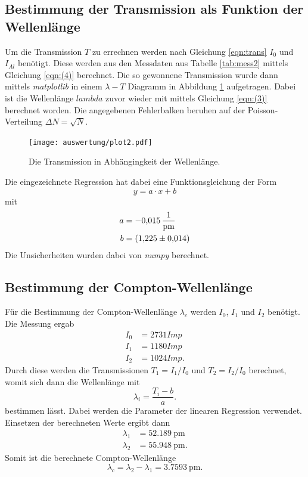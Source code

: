 \subsection{Bestimmung der Transmission als Funktion der Wellenlänge}
\label{sec:transmission}
Um die Transmission $T$ zu errechnen werden nach Gleichung \eqref{eqn:trans} $I_{0}$ und $I_{Al}$ benötigt. Diese werden aus den Messdaten
aus Tabelle \ref{tab:mess2} mittels Gleichung \eqref{eqn:(4)} berechnet. Die so gewonnene Transmission wurde dann mittels 
\textit{matplotlib} \cite{matplotlib} in einem $\lambda-T$ Diagramm in Abbildung \ref{fig:plot2} aufgetragen. Dabei ist die Wellenlänge
$lambda$ zuvor wieder mit mittels Gleichung \eqref{eqn:(3)} berechnet worden. Die angegebenen Fehlerbalken beruhen auf der Poisson-Verteilung
$\Delta N=\sqrt{N}$.
\begin{figure}[H]
    \centering
    \texttt{[image: auswertung/plot2.pdf]}
    \caption{Die Transmission in Abhängingkeit der Wellenlänge.}
    \label{fig:plot2}
\end{figure}
\noindent
Die eingezeichnete Regression hat dabei eine Funktionsgleichung der Form
  \begin{equation*}
      y=a\cdot x+b \label{eqn:gerade}
  \end{equation*} 
mit
  \begin{align*}
    a &= \SI{-0.015 \pm 0.000}{\per\pico\metre}\\
    b &= \SI{1.225 \pm 0.014}.
  \end{align*}
Die Unsicherheiten wurden dabei von  \textit{numpy} \cite{numpy} berechnet.

\subsection{Bestimmung der Compton-Wellenlänge}
\label{sec:compton}
Für die Bestimmung der Compton-Wellenlänge $\lambda_c$ werden $I_0$, $I_1$ und $I_2$ benötigt.
Die Messung ergab
\begin{align*}
    I_0 &= 2731 \si{Imp}\\
    I_1 &= 1180 \si{Imp}\\
    I_2 &= 1024 \si{Imp}.
\end{align*}  
Durch diese werden die Transmissionen $T_1=I_1/I_0$ und  $T_2=I_2/I_0$ berechnet, womit sich dann die Wellenlänge mit
\begin{equation*}
    \lambda_i = \frac{T_i -b}{a}. 
\end{equation*}
bestimmen lässt. Dabei werden die Parameter der linearen Regression verwendet.
Einsetzen der berechneten Werte ergibt dann
\begin{align*}
    \lambda_1 &= \SI{52.189}{\pico\metre}\\
    \lambda_2 &= \SI{55.948}{\pico\metre}.
\end{align*}
Somit ist die berechnete Compton-Wellenlänge
\begin{equation*}
    \lambda_c=\lambda_2-\lambda_1= \SI{3.7593}{\pico\metre}.
\end{equation*}
